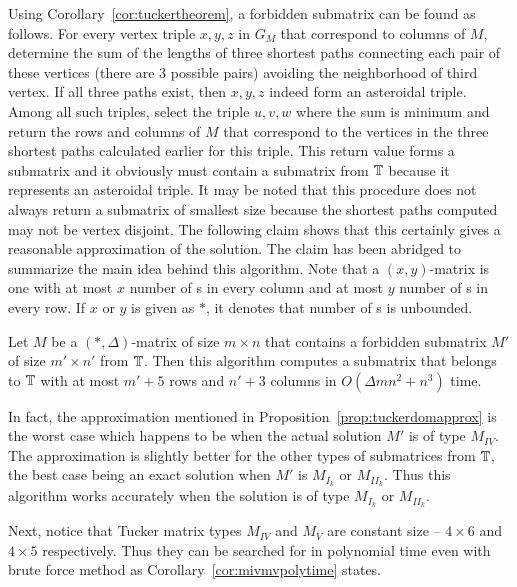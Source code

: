 Using Corollary~\ref{cor:tuckertheorem}, a forbidden submatrix can be
found as follows. For every vertex triple $x, y, z$ in $G_M$ that
correspond to columns of $M$, determine the sum of the lengths of
three shortest paths connecting each pair of these vertices (there are
3 possible pairs) avoiding the neighborhood of third vertex. If all
three paths exist, then $x, y, z$ indeed form an asteroidal
triple. Among all such triples, select the triple $u, v, w$ where the
sum is minimum and return the rows and columns of $M$ that correspond
to the vertices in the three shortest paths calculated earlier for this triple. This
return value forms a submatrix and it obviously must contain a
submatrix from $\mathbb{T}$ because it represents an asteroidal
triple. It may be noted that this procedure does not always return a
submatrix of smallest size because the shortest paths computed may not
be vertex disjoint. The following claim shows that this certainly
gives a reasonable approximation of the solution. The claim has been
abridged to summarize the main idea behind this algorithm.
Note that a $(x,y)$-matrix is one with at most $x$ number of {\un}s in every
column and at most $y$ number of {\un}s in every row. If $x$ or $y$ is given as
$*$, it denotes that number of {\un}s is unbounded.

\begin{proposition} 
  \label{prop:tuckerdomapprox}
  Let $M$ be a $(*,\Delta)$-matrix of size $m \times n$ that contains
  a forbidden submatrix $M'$ of size $m' \times n'$ from $\mathbb{T}$. Then
  this algorithm computes a submatrix that belongs to $\mathbb{T}$
  with at most $m'+5$ rows and $n'+3$ columns in $O(\Delta m n^2 +
  n^3)$ time.
\end{proposition}

In fact, the approximation mentioned in
Proposition~\ref{prop:tuckerdomapprox} is the worst case which happens
to be when the actual solution $M'$ is of type $M_{IV}$. The
approximation is slightly better for the other types of submatrices
from $\mathbb{T}$, the best case being an exact solution when $M'$ is
$M_{I_k}$ or $M_{II_k}$. Thus this algorithm works accurately when the
solution is of type $M_{I_k}$ or $M_{II_k}$.

Next, notice that Tucker matrix types $M_{IV}$ and $M_{V}$ are
constant size -- $4 \times 6$ and $4 \times 5$ respectively. Thus they
can be searched for in polynomial time even with brute force method as
Corollary~\ref{cor:mivmvpolytime} states.

